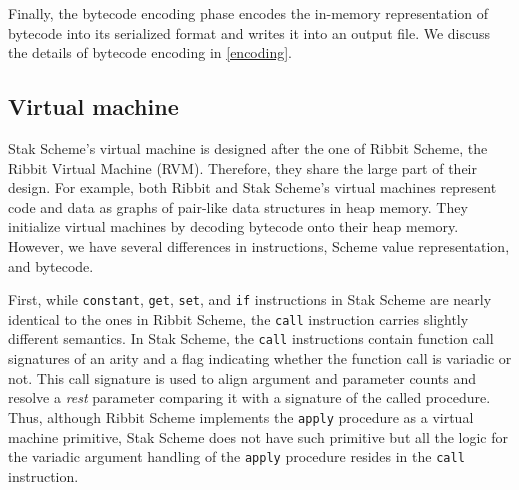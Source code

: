 \documentclass[sigplan, anonymous, review]{acmart}
\begin{document}
Finally, the bytecode encoding phase encodes the in-memory representation of
bytecode into its serialized format and writes it into an output file.
We discuss the details of bytecode encoding in \ref{encoding}.

\subsection{Virtual machine} \label{vm}

Stak Scheme's virtual machine is designed after the one of Ribbit
Scheme, the Ribbit Virtual Machine (RVM).
Therefore, they share the large part of their design.
For example, both Ribbit and Stak Scheme's virtual machines represent
code and data as graphs of pair-like data structures in heap memory.
They initialize virtual machines by decoding bytecode onto
their heap memory.
However, we have several differences in instructions, Scheme value
representation, and bytecode.

First, while \texttt{constant}, \texttt{get}, \texttt{set}, and
\texttt{if} instructions in Stak Scheme are nearly identical to the ones in
Ribbit Scheme, the \texttt{call} instruction carries slightly
different semantics.
In Stak Scheme, the \texttt{call} instructions
contain function call signatures of an arity and
a flag indicating whether the function call is variadic or not.
This call signature is used to align argument and parameter counts and
resolve a \textit{rest} parameter comparing it with a signature of
the called procedure.
Thus, although Ribbit Scheme implements the \texttt{apply}
procedure as a virtual machine primitive, Stak Scheme does not have
such primitive but all the logic for the variadic argument handling
of the \texttt{apply} procedure resides in the \texttt{call} instruction.
\end{document}
